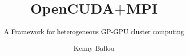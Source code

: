 \documentclass{beamer}
\title{OpenCUDA+MPI}
\subtitle{A Framework for heterogeneous GP-GPU cluster computing}
\author[Ballou]{Kenny Ballou}
\begin{document}
\frame{\titlepage}
\end{document}

